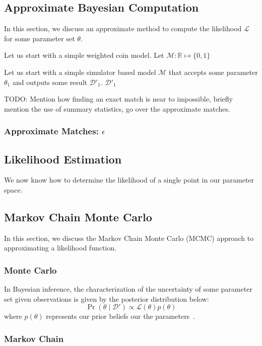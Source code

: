 \subsection{Approximate Bayesian Computation}\label{subsec:abc}
In this section, we discuss an approximate method to compute the likelihood $\mathcal{L}$ for some parameter set $\theta$.

Let us start with a simple weighted coin model.
Let $\mathcal{M} : \mathbb{R} \mapsto \{ 0, 1 \}$



Let us start with a simple simulator based model $\mathcal{M}$ that accepts some parameter $\theta_1$ and outputs some
result $\mathcal{D}'_1$.
$\mathcal{D}'_1$

TODO: Mention how finding an exact match is near to impossible, briefly mention the use of summary statistics,
go over the approximate matches.

\subsubsection{Approximate Matches: $\epsilon$}

\subsection{Likelihood Estimation}\label{subsec:le}
We now know how to determine the likelihood of a single point in our parameter space.


\subsection{Markov Chain Monte Carlo}\label{subsec:mcmc}
In this section, we discuss the Markov Chain Monte Carlo (MCMC) approach to approximating a likelihood function.

\subsubsection{Monte Carlo}
In Bayesian inference, the characterization of the uncertainty of some parameter set given observations is given by
the posterior distribution below:
\begin{equation}
    \Pr(\theta \mid \mathcal{D}') \propto \mathcal{L}(\theta) p(\theta)
\end{equation}
where $p(\theta)$ represents our prior beliefs our the parameters~\cite{liepeABCSysBioApproximateBayesian2010}.

\subsubsection{Markov Chain}

